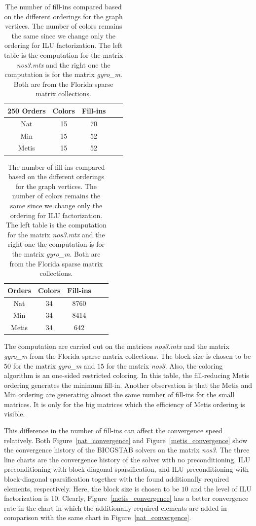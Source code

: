 \documentclass[12pt, twoside,a4paper,toc=bibliography]{scrbook}
\begin{document}
\begin{table}
\begin{tabular}{|c|c|c|c|c|}
\hline250
Orders & Colors & Fill-ins\\\hline
Nat & 15 & 70\\\hline
Min & 15 & 52\\\hline
Metis & 15 & 52\\\hline
\end{tabular}
\hfill
\begin{tabular}{|c|c|c|c|c|}
\hline
Orders & Colors & Fill-ins \\\hline
Nat & 34 & 8760 \\\hline
Min & 34 & 8414 \\\hline
Metis & 34 & 642\\\hline
\end{tabular}
\caption{The number of fill-ins compared based on the different orderings
for the graph vertices. The number of colors remains the same since we change only the ordering for
ILU factorization.
The left table is the computation for the matrix \textit{nos3.mtx}
and the right one the computation is for the matrix \textit{gyro\_m}.
Both are from the Florida sparse matrix collections.}
\label{ilu-effect}
\end{table}

The computation are carried out on the matrices \textit{nos3.mtx}
and the matrix \textit{gyro\_m} from
the Florida sparse matrix collections. The block size is
chosen to be $50$ for the matrix \textit{gyro\_m} and $15$ for
the matrix \textit{nos3}. Also, the coloring algorithm is an one-sided
restricted coloring. In this table, the fill-reducing Metis ordering
generates the minimum fill-in.
Another observation is that the Metis and Min ordering are generating almost the same
number of fill-ins for the small matrices.
It is only for the big matrices which the efficiency of Metis ordering is visible.

This difference in the number of fill-ins can affect the convergence speed
relatively. Both Figure~\ref{nat_convergence}
and Figure~\ref{metis_convergence} show
the convergence history of the BICGSTAB solvers on the matrix \textit{nos3}.
The three line charts are the convergence history of the solver with
no preconditioning, ILU preconditioning with block-diagonal sparsification,
and ILU preconditioning with block-diagonal sparsification together with the found
additionally required elements, respectively.
Here, the block size is chosen to be $10$ and the level of ILU factorization
is $10$.
Clearly, Figure~\ref{metis_convergence} has a better convergence rate in the chart
in which the additionally required elements are added in comparison with the same
chart in Figure~\ref{nat_convergence}.
\end{document}
